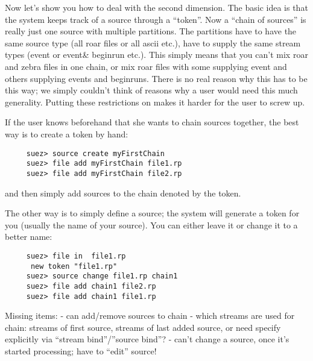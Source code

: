 \documentclass[12pt]{article}
\begin{document}
Now let's show you how to deal with the second dimension.
The basic idea is that the system keeps track of a source through a
``token''. Now a ``chain of sources'' is really just one source with
multiple partitions. The partitions have to have the same source type
(all roar files or all ascii etc.), have to supply the same stream types
(event or event\& beginrun etc.). This simply means that you can't mix
roar and zebra files in one chain, or mix roar files with some supplying
event and others supplying events and beginruns. There is no real reason
why this has to be this way; we simply couldn't think of reasons why a
user would need this much generality. Putting these restrictions on
makes it harder for the user to screw up.

%                                                         

If the user knows beforehand that she wants to chain sources together,
the best way is to create a token by hand:
%
\begin{verbatim}
     suez> source create myFirstChain                    
     suez> file add myFirstChain file1.rp                
     suez> file add myFirstChain file2.rp                
\end{verbatim}
%
and then simply add sources to the chain denoted by the token.

The other way is to simply define a source; the system will generate a
token for you (usually the name of your source). You can either leave it
or change it to a better name:
%
\begin{verbatim}
     suez> file in  file1.rp                             
      new token "file1.rp"                              
     suez> source change file1.rp chain1                  
     suez> file add chain1 file2.rp                      
     suez> file add chain1 file1.rp                      
\end{verbatim}


Missing items:
- can add/remove sources to chain
- which streams are used for chain: streams of first source, streams of
last added source, or need specify explicitly via ``stream
bind''/''source bind''?
- can't change a source, once it's started processing; have to ``edit''
source!
\end{document}
